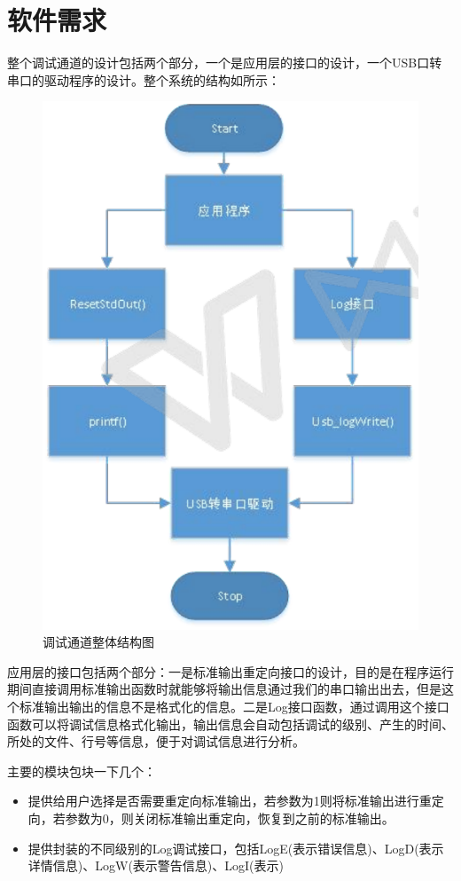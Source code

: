 \section{软件需求}

	整个调试通道的设计包括两个部分，一个是应用层的接口的设计，一个USB口转串口的驱动程序的设计。整个系统的结构如所示：
\begin{figure}[!h]
\centering
\includegraphics[width=.7\textwidth]{./graphics/system-structure-diagram.pdf}
\caption{调试通道整体结构图}\label{fig:调试通道结构图}
\end{figure}

应用层的接口包括两个部分：一是标准输出重定向接口的设计，目的是在程序运行期间直接调用标准输出函数时就能够将输出信息通过我们的串口输出出去，但是这个标准输出输出的信息不是格式化的信息。二是Log接口函数，通过调用这个接口函数可以将调试信息格式化输出，输出信息会自动包括调试的级别、产生的时间、所处的文件、行号等信息，便于对调试信息进行分析。

主要的模块包块一下几个：
\begin{itemize}
\item {} 提供给用户选择是否需要重定向标准输出，若参数为1则将标准输出进行重定向，若参数为0，则关闭标准输出重定向，恢复到之前的标准输出。

\item {} 提供封装的不同级别的Log调试接口，包括LogE(表示错误信息)、LogD(表示详情信息)、LogW(表示警告信息)、LogI(表示)
\end{itemize}
	
